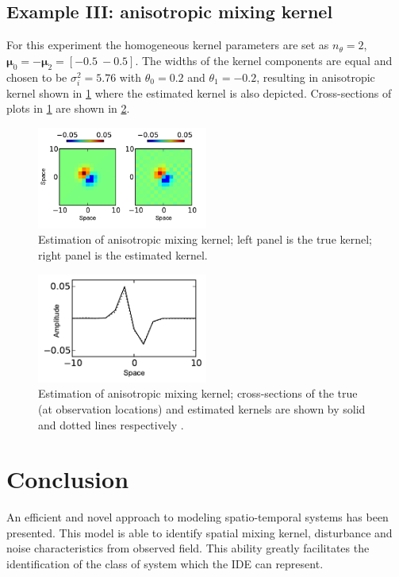 \documentclass[10pt,twocolumn,twoside]{IEEEtran}
\begin{document}
 \subsection{Example III: anisotropic mixing kernel}
For this experiment the homogeneous kernel parameters are set as $n_\theta=2$, $\boldsymbol\mu_0=-\boldsymbol\mu_2=[-0.5~-0.5]$. The widths  of the kernel components are equal and chosen to be $\sigma_i^2=5.76$ with $\theta_0=0.2$ and $\theta_1=-0.2$, resulting in anisotropic kernel shown in \figurename{\ref{fig:1anisoKernel2d}} where the estimated kernel is also depicted. Cross-sections of plots in \figurename{\ref{fig:1anisoKernel2d}} are shown in \figurename{\ref{fig:1anisoKernel1d}}.
\begin{figure}[!h] 
 \centering
 \includegraphics[width=0.5\textwidth]{./Graph/1anisoKernelEstimation2d.pdf}
 \caption{Estimation of anisotropic mixing kernel; left panel is the true kernel; right panel is the estimated kernel.}
 \label{fig:1anisoKernel2d}
 \end{figure}
\begin{figure}[!h] 
 \centering
 \includegraphics[width=0.5\textwidth]{./Graph/1anisoKernelSupportEstimation1d.pdf}
 \caption{Estimation of anisotropic mixing kernel;  cross-sections of the true (at observation locations) and estimated kernels are shown by solid and dotted lines respectively .}
 \label{fig:1anisoKernel1d}    
 \end{figure} 
\section{Conclusion}
An efficient and novel approach to modeling spatio-temporal systems has been presented. This model is able to identify spatial mixing kernel, disturbance and noise characteristics from observed field. This ability greatly facilitates the identification of the class of system which the IDE can represent.
\end{document}
